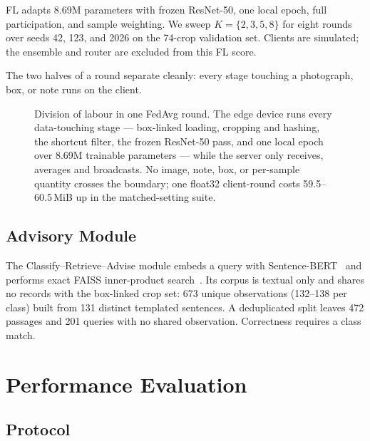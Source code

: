 \documentclass[conference]{IEEEtran}
\begin{document}
FL adapts 8.69M parameters with frozen ResNet-50, one local epoch, full
participation, and sample weighting. We sweep $K=\{2,3,5,8\}$ for eight rounds
over seeds 42, 123, and 2026 on the 74-crop validation set. Clients are simulated;
the ensemble and router are excluded from this FL score.

The two halves of a round separate cleanly: every stage
touching a photograph, box, or note runs on the client.


\begin{figure}[tbp]
\centering
\resizebox{0.8363\textwidth}{!}{}
\caption{Division of labour in one FedAvg round. The edge device runs every
data-touching stage --- box-linked loading, cropping and hashing, the shortcut
filter, the frozen ResNet-50 pass, and one local epoch over 8.69M trainable
parameters --- while the server only receives, averages and broadcasts. No image,
note, box, or per-sample quantity crosses the boundary; one float32 client-round
costs 59.5--60.5\,MiB up in the matched-setting suite.}
\label{fig:edge_cloud}
\end{figure}



\subsection{Advisory Module}
\label{sec:rag}

The Classify--Retrieve--Advise module embeds a query with
Sentence-BERT~\cite{Reimers2019} and performs exact FAISS inner-product
search~\cite{Johnson2019,Lewis2020RAG}. Its corpus is textual only and shares no
records with the box-linked crop set: 673 unique observations (132--138 per class)
built from 131 distinct templated sentences. A deduplicated split leaves 472
passages and 201 queries with no shared observation. Correctness requires a class
match.

\section{Performance Evaluation}
\label{sec:eval}

\subsection{Protocol}
\end{document}
